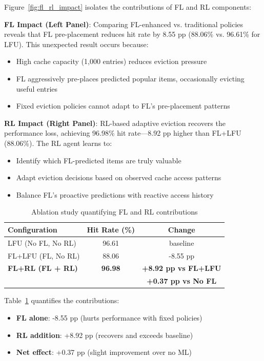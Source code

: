 Figure~\ref{fig:fl_rl_impact} isolates the contributions of FL and RL components:

\textbf{FL Impact (Left Panel)}: Comparing FL-enhanced vs. traditional policies reveals that FL pre-placement reduces hit rate by 8.55 pp (88.06\% vs. 96.61\% for LFU). This unexpected result occurs because:
\begin{itemize}
    \item High cache capacity (1,000 entries) reduces eviction pressure
    \item FL aggressively pre-places predicted popular items, occasionally evicting useful entries
    \item Fixed eviction policies cannot adapt to FL's pre-placement patterns
\end{itemize}

\textbf{RL Impact (Right Panel)}: RL-based adaptive eviction recovers the performance loss, achieving 96.98\% hit rate—8.92 pp higher than FL+LFU (88.06\%). The RL agent learns to:
\begin{itemize}
    \item Identify which FL-predicted items are truly valuable
    \item Adapt eviction decisions based on observed cache access patterns
    \item Balance FL's proactive predictions with reactive access history
\end{itemize}

\begin{table}[t]
\centering
\caption{Ablation study quantifying FL and RL contributions}
\label{table:ablation_study}
\small
\begin{tabular}{l|c|c}
\hline
\textbf{Configuration} & \textbf{Hit Rate (\%)} & \textbf{Change} \\
\hline
LFU (No FL, No RL) & 96.61 & baseline \\
FL+LFU (FL, No RL) & 88.06 & -8.55 pp \\
\textbf{FL+RL (FL + RL)} & \textbf{96.98} & \textbf{+8.92 pp vs FL+LFU} \\
& & \textbf{+0.37 pp vs No FL} \\
\hline
\end{tabular}
\end{table}

Table~\ref{table:ablation_study} quantifies the contributions:
\begin{itemize}
    \item \textbf{FL alone}: -8.55 pp (hurts performance with fixed policies)
    \item \textbf{RL addition}: +8.92 pp (recovers and exceeds baseline)
    \item \textbf{Net effect}: +0.37 pp (slight improvement over no ML)
\end{itemize}

